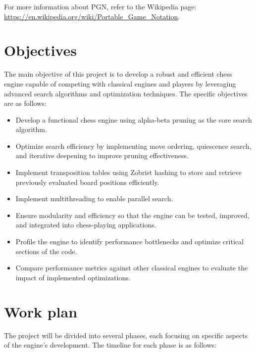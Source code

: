 \noindent For more information about PGN, refer to the Wikipedia page: \url{https://en.wikipedia.org/wiki/Portable_Game_Notation}.

\section{Objectives}
\label{sec:objectives}

The main objective of this project is to develop a robust and efficient chess engine capable of competing with classical engines and players by leveraging advanced search algorithms and optimization techniques. The specific objectives are as follows:

\begin{itemize}
    \item Develop a functional chess engine using alpha-beta pruning as the core search algorithm.
    \item Optimize search efficiency by implementing move ordering, quiescence search, and iterative deepening to improve pruning effectiveness.
    \item Implement transposition tables using Zobrist hashing to store and retrieve previously evaluated board positions efficiently.
    \item Implement multithreading to enable parallel search.
    \item Ensure modularity and efficiency so that the engine can be tested, improved, and integrated into chess-playing applications.
    \item Profile the engine to identify performance bottlenecks and optimize critical sections of the code.
    \item Compare performance metrics against other classical engines to evaluate the impact of implemented optimizations.
\end{itemize}

\section{Work plan}

The project will be divided into several phases, each focusing on specific aspects of the engine's development. The timeline for each phase is as follows:

